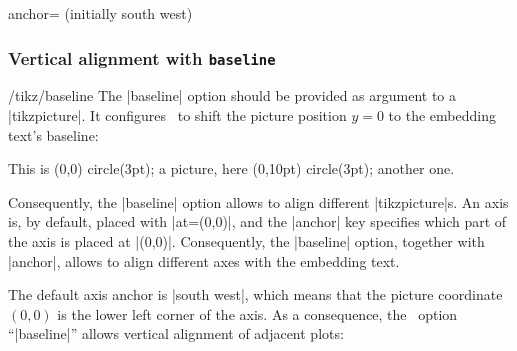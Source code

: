 \begin{pgfplotskey}{anchor= (initially south west)}
\subsubsection{Vertical alignment with \texttt{baseline}}
\label{sec:align}%
\begin{key}{/tikz/baseline}
The |baseline| option should be provided as argument to a |tikzpicture|. It configures \Tikz\ to shift the picture position $y=0$ to the embedding text's baseline:
\begin{codeexample}[width=3cm]
This is \tikz[baseline]\fill[red] (0,0) circle(3pt); a picture, 
here \tikz[baseline]\fill[red] (0,10pt) circle(3pt); another one.
\end{codeexample}
\noindent Consequently, the |baseline| option allows to align different |tikzpicture|s. An axis is, by default, placed with |at={(0,0)}|, and the |anchor| key specifies which part of the axis is placed at |(0,0)|. Consequently, the |baseline| option, together with |anchor|, allows to align different axes with the embedding text.

The default axis anchor is |south west|, which means that the picture coordinate $(0,0)$ is the lower left corner of the axis. As a consequence, the \Tikz\ option ``|baseline|'' allows vertical alignment of adjacent plots:
\begin{codeexample}[]
\pgfplotsset{domain=-1:1}
%
\hspace{0.15cm}
\end{codeexample}


\end{key}
\end{pgfplotskey}
